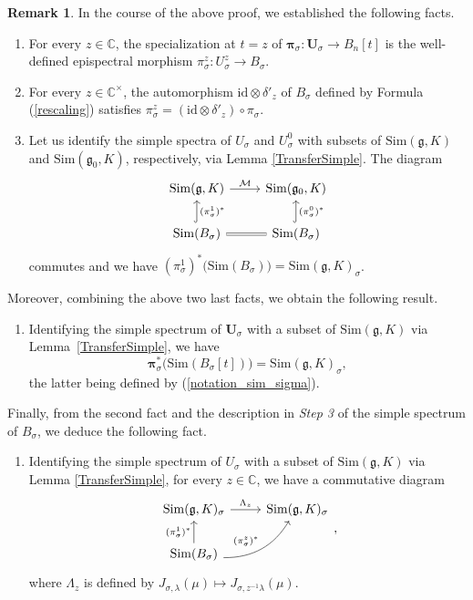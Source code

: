 \documentclass{amsart}
\theoremstyle{definition}
\newtheorem{remark}[theorem]{Remark}
\begin{document}
\begin{remark}\label{facts_after_proof} In the course of the above proof, we established the following facts.
\begin{enumerate}
    \item For every $z \in \mathbb{C}$, the specialization at $t= z$ of $\bm{\pi}_\sigma : \bm{U}_\sigma \to B_n[t]$ is the well-defined epispectral morphism $\pi_\sigma^z : U_\sigma^z \to B_\sigma$.
    \item For every $z \in \mathbb{C}^\times$, the automorphism $\mathrm{id} \otimes \delta'_z$ of $B_\sigma$ defined by Formula (\ref{rescaling}) satisfies $\pi_\sigma^z = (\mathrm{id} \otimes \delta'_z)\circ \pi_\sigma$.
    \item Let us identify the simple spectra of $U_\sigma$ and $U_\sigma^0$ with subsets of $\mathrm{Sim}(\mathfrak{g},K)$ and $\mathrm{Sim}(\mathfrak{g}_0,K)$, respectively, via Lemma \ref{TransferSimple}. The diagram
    \[\begin{tikzcd}
        \mathrm{Sim}(\mathfrak{g},K) \ar[r, "\mathcal{M}"] & \mathrm{Sim}(\mathfrak{g}_0,K) \\
        \mathrm{Sim}(B_\sigma) \ar[u, "(\pi_\sigma^1)^*"', hookrightarrow] \ar[r, equals] & \mathrm{Sim}(B_\sigma) \ar[u, "(\pi_\sigma^0)^*"', hookrightarrow]
    \end{tikzcd}\]
    commutes and we have $(\pi_\sigma^1)^*\big(\mathrm{Sim}(B_\sigma) \big) = \mathrm{Sim}(\mathfrak{g},K)_\sigma$.
\end{enumerate}
Moreover, combining the above two last facts, we obtain the following result.
    \begin{enumerate}[resume]
        \item Identifying the simple spectrum of $\bm{U}_\sigma$ with a subset of $\mathrm{Sim}(\bm{\mathfrak{g}},K)$ via Lemma~\ref{TransferSimple}, we have
    \[\bm{\pi}_\sigma^*\big(\mathrm{Sim}(B_\sigma[t])\big) = \mathrm{Sim}(\bm{\mathfrak{g}},K)_\sigma,\]
    the latter being defined by (\ref{notation_sim_sigma}).
    \end{enumerate}
Finally, from the second fact and the description in \textit{Step 3} of the simple spectrum of $B_\sigma$, we deduce the following fact.
    \begin{enumerate}[resume]
        \item Identifying the simple spectrum of $U_\sigma$ with a subset of $\mathrm{Sim}(\mathfrak{g},K)$ via Lemma \ref{TransferSimple}, for every $z \in \mathbb{C}$, we have a commutative diagram
        \[\begin{tikzcd}
        \mathrm{Sim}(\mathfrak{g},K)_\sigma \ar[r, "\Lambda_z"] & \mathrm{Sim}(\mathfrak{g},K)_\sigma \\
        \mathrm{Sim}(B_\sigma) \ar[u, "(\pi_\sigma^1)^*"] \ar[ur, "(\pi_\sigma^z)^*", bend right]&
    \end{tikzcd},\]
    where $\Lambda_z$ is defined by
    \(J_{\sigma,\lambda}(\mu) \mapsto J_{\sigma,z^{-1}\lambda}(\mu)\).
    \end{enumerate}
\end{remark}
\end{document}
